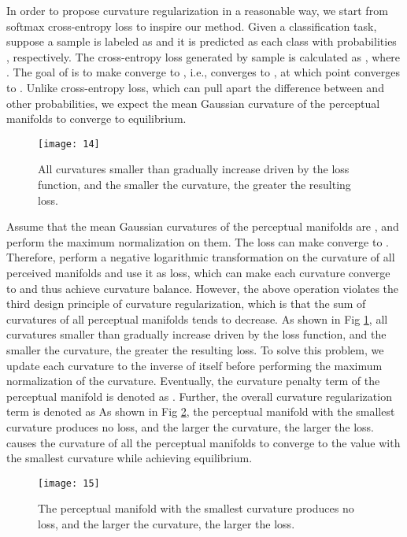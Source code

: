 \documentclass[10pt,twocolumn,letterpaper]{article}
\begin{document}
In order to propose curvature regularization in a reasonable way, we start from softmax cross-entropy loss to inspire our method. Given a  classification task, suppose a sample  is labeled as  and it is predicted as each class with probabilities , respectively. The cross-entropy loss generated by sample  is calculated as , where . The goal of  is to make  converge to , i.e.,  converges to , at which point  converges to . Unlike cross-entropy loss, which can pull apart the difference between  and other probabilities, we expect the mean Gaussian curvature of the  perceptual manifolds to converge to equilibrium.

\begin{figure}[h]
\centering
\centerline{\texttt{[image: 14]}}
\caption{All curvatures smaller than  gradually increase driven by the loss function, and the smaller the curvature, the greater the resulting loss.}
\label{fig14}
\vskip -0.12in
\end{figure}

Assume that the mean Gaussian curvatures of the  perceptual manifolds are , and perform the maximum normalization on them. The  loss can make  converge to . Therefore, perform a negative logarithmic transformation on the curvature of all perceived manifolds and use it as loss, which can make each curvature converge to  and thus achieve curvature balance. However, the above operation violates the third design principle of curvature regularization, which is that the sum of curvatures of all perceptual manifolds tends to decrease. As shown in Fig \ref{fig14}, all curvatures smaller than  gradually increase driven by the loss function, and the smaller the curvature, the greater the resulting loss. To solve this problem, we update each curvature to the inverse of itself before performing the maximum normalization of the curvature. Eventually, the curvature penalty term of the perceptual manifold  is denoted as . Further, the overall curvature regularization term is denoted as  As shown in Fig \ref{fig15}, the perceptual manifold with the smallest curvature produces no loss, and the larger the curvature, the larger the loss.  causes the curvature of all the perceptual manifolds to converge to the value with the smallest curvature while achieving equilibrium.

\begin{figure}[h]
\centering
\centerline{\texttt{[image: 15]}}
\caption{The perceptual manifold with the smallest curvature produces no loss, and the larger the curvature, the larger the loss.}
\label{fig15}
\vskip -0.1in
\end{figure}
\end{document}
